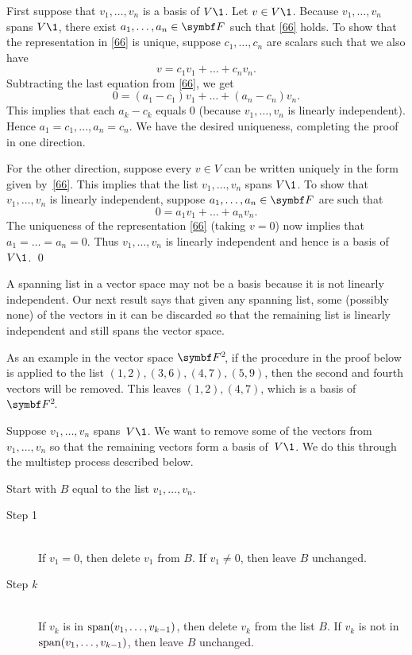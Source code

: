 \proof
First suppose that $v_1, \dots, v_n$ is a basis of $V\1$.  Let $v \in V\1$.  Because $v_1, \dots, v_n$ spans $V\1$, there exist $a_1, \dots, a_n \in \F{}$ such that \ref{66} holds.  To show that the representation in \ref{66} is unique, suppose $c_1, \dots, c_n$ are scalars such that we also have
\[
v = c_1 v_1 + \dots + c_n v_n.
\]
Subtracting the last equation from \ref{66}, we get
\[
0 = (a_1 - c_1) v_1 + \dots + (a_n - c_n) v_n.
\]
This implies that each $a_k - c_k$ equals $0$ (because $v_1, \dots, v_n$ is linearly
independent). Hence $a_1 = c_1, \dots, a_n = c_n$. We have
the desired uniqueness, completing the proof in one direction.

For the other direction, suppose every $v \in V$ can be written uniquely in
the form given by~\ref{66}.  This implies that the list $v_1, \dots, v_n$ spans
$V\1$.  To show that $v_1, \dots, v_n$ is linearly independent, suppose
$a_1, \dots, a_n \in \F{}$ are such that
\[
0 = a_1 v_1 + \dots + a_n v_n.
\]
The uniqueness of the representation \ref{66} (taking $v = 0$) now implies that
\mbox{$a_1 = \dots = a_n = 0$}.  Thus $v_1, \dots, v_n$ is linearly independent and
hence is a basis of~$V\1$.
\qed

A spanning list in a vector space may not be a basis because it is not linearly
independent.  Our next result says that given any spanning list, some (possibly none) of the vectors in it can be discarded so that the remaining list is linearly
independent and still spans the vector space.

As an example in the vector space $\FF{2}$, if the procedure in the proof below is applied to the list $ (1,2), (3, 6), (4, 7), (5, 9)$, then the second and fourth vectors will be removed. This leaves $(1,2), (4, 7)$, which is a basis of $\FF{2}$.


\proof
Suppose $v_1, \dots, v_n$ spans~$V\1$.  We want to remove some of the
vectors from $v_1, \dots, v_n$ so that the remaining vectors form a basis
of~$V\1$.  We do this through the multistep process described below.

Start with $B$ equal to the list $v_1, \dots, v_n$.

\begin{description}
\item[Step 1] \ \\
If $v_1 = 0$, then delete $v_1$  from $B$.  If $v_1 \ne 0$, then leave $B$ unchanged.

\item[Step \textit{k}] \ \\
If $v_k$ is in $\operatorname{span}(v_1, \dots, v_{k-1})$, then delete $v_k$  from the list $B$.  If
$v_k$ is not in $\operatorname{span}(v_1, \dots, v_{k-1})$, then leave $B$ unchanged.
\end{description}

